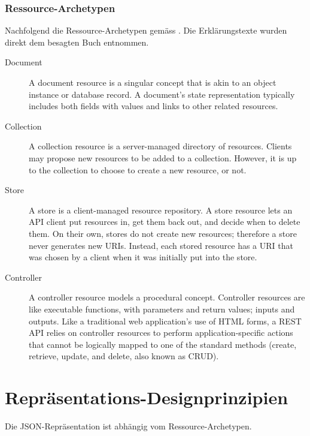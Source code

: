 \documentclass[10pt,a4paper]{scrartcl}
\begin{document}
\subsubsection*{Ressource-Archetypen}

Nachfolgend die Ressource-Archetypen gemäss \cite{masse2011rest}. Die Erklärungstexte wurden direkt dem besagten
Buch entnommen.

\begin{description}
	\item[Document] A document resource is a singular concept that is akin to an object instance or database
		record. A document’s state representation typically includes both fields with values and
		links to other related resources.
	\item[Collection] A collection resource is a server-managed directory of resources. Clients may propose
		new resources to be added to a collection. However, it is up to the collection to choose
		to create a new resource, or not.
	\item[Store] A store is a client-managed resource repository. A store resource lets an API client put
		resources in, get them back out, and decide when to delete them. On their own, stores
		do not create new resources; therefore a store never generates new URIs. Instead, each
		stored resource has a URI that was chosen by a client when it was initially put into the
		store.
	\item[Controller] A controller resource models a procedural concept. Controller resources are like
		executable functions, with parameters and return values; inputs and outputs.
		Like a traditional web application’s use of HTML forms, a REST API relies on controller
		resources to perform application-specific actions that cannot be logically mapped to
		one of the standard methods (create, retrieve, update, and delete, also known as
		CRUD).
\end{description}


\section{Repräsentations-Designprinzipien}

Die JSON-Repräsentation ist abhängig vom Ressource-Archetypen.
\end{document}
